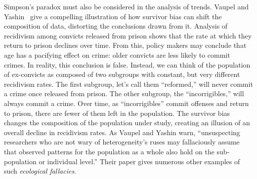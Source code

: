 Simpson's paradox must also be considered in the analysis of trends. Vaupel and Yashin~\cite{Vaupel85heterogeneity} give a compelling illustration of how survivor bias can shift the composition of data, distorting the conclusions drawn from it. Analysis of recidivism among convicts released from prison shows that the rate at which they return to prison declines over time. From this, policy makers may conclude that age has a pacifying effect on crime: older convicts are less likely to commit crimes. In reality, this conclusion is false. %
Instead, we can think of the population of ex-convicts as composed of two subgroups with constant, but very different recidivism rates. The first subgroup, let's call them ``reformed,'' will never commit a crime once released from prison. The other subgroup, the ``incorrigibles,'' will always commit a crime. Over time, as ``incorrigibles'' commit offenses and return to prison, there are fewer of them left in the population. The survivor bias changes the composition of the population under study, creating an illusion of an overall decline in recidivism rates. As Vaupel and Yashin warn, ``unsuspecting researchers who are not wary of heterogeneity's ruses may fallaciously assume that observed patterns for the population as a whole also hold on the sub-population or individual level.'' Their paper gives numerous other examples of such \emph{ecological fallacies}.

